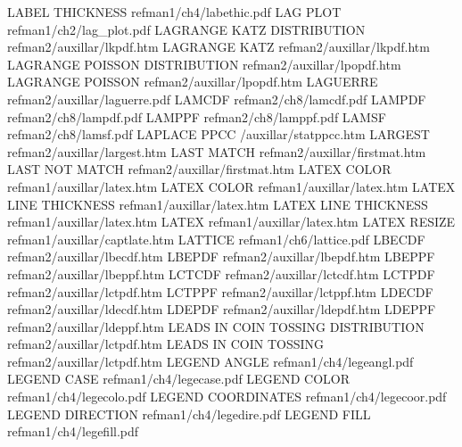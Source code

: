 LABEL THICKNESS                         refman1/ch4/labethic.pdf
LAG PLOT                                refman1/ch2/lag_plot.pdf
LAGRANGE KATZ DISTRIBUTION              refman2/auxillar/lkpdf.htm
LAGRANGE KATZ                           refman2/auxillar/lkpdf.htm
LAGRANGE POISSON DISTRIBUTION           refman2/auxillar/lpopdf.htm
LAGRANGE POISSON                        refman2/auxillar/lpopdf.htm
LAGUERRE                                refman2/auxillar/laguerre.pdf
LAMCDF                                  refman2/ch8/lamcdf.pdf
LAMPDF                                  refman2/ch8/lampdf.pdf
LAMPPF                                  refman2/ch8/lamppf.pdf
LAMSF                                   refman2/ch8/lamsf.pdf
LAPLACE PPCC                            /auxillar/statppcc.htm
LARGEST                                 refman2/auxillar/largest.htm
LAST MATCH                              refman2/auxillar/firstmat.htm
LAST NOT MATCH                          refman2/auxillar/firstmat.htm
LATEX COLOR                             refman1/auxillar/latex.htm
LATEX COLOR                             refman1/auxillar/latex.htm
LATEX LINE THICKNESS                    refman1/auxillar/latex.htm
LATEX LINE THICKNESS                    refman1/auxillar/latex.htm
LATEX                                   refman1/auxillar/latex.htm
LATEX RESIZE                            refman1/auxillar/captlate.htm
LATTICE                                 refman1/ch6/lattice.pdf
LBECDF                                  refman2/auxillar/lbecdf.htm
LBEPDF                                  refman2/auxillar/lbepdf.htm
LBEPPF                                  refman2/auxillar/lbeppf.htm
LCTCDF                                  refman2/auxillar/lctcdf.htm
LCTPDF                                  refman2/auxillar/lctpdf.htm
LCTPPF                                  refman2/auxillar/lctppf.htm
LDECDF                                  refman2/auxillar/ldecdf.htm
LDEPDF                                  refman2/auxillar/ldepdf.htm
LDEPPF                                  refman2/auxillar/ldeppf.htm
LEADS IN COIN TOSSING DISTRIBUTION      refman2/auxillar/lctpdf.htm
LEADS IN COIN TOSSING                   refman2/auxillar/lctpdf.htm
LEGEND ANGLE                            refman1/ch4/legeangl.pdf
LEGEND CASE                             refman1/ch4/legecase.pdf
LEGEND COLOR                            refman1/ch4/legecolo.pdf
LEGEND COORDINATES                      refman1/ch4/legecoor.pdf
LEGEND DIRECTION                        refman1/ch4/legedire.pdf
LEGEND FILL                             refman1/ch4/legefill.pdf
